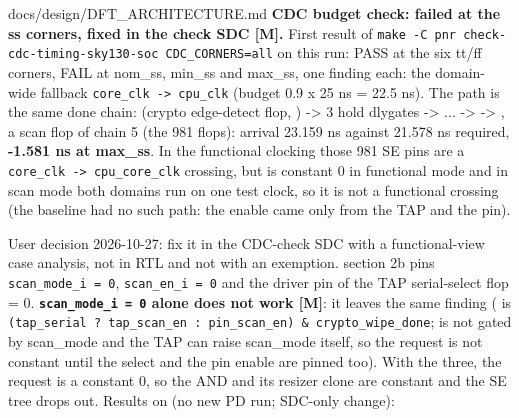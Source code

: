 \begin{relocated}{docs/design/DFT_ARCHITECTURE.md}
\textbf{CDC budget check: failed at the ss corners, fixed in the check
SDC {[}M{]}.} First result of
\texttt{make\ -\allowbreak{}C\ pnr\ check-\allowbreak{}cdc-\allowbreak{}timing-\allowbreak{}sky130-\allowbreak{}soc\ CDC\_\allowbreak{}CORNERS=\allowbreak{}all}
on this run: PASS at the six tt/ff corners, FAIL at nom\_ss, min\_ss and
max\_ss, one finding each: the domain-wide fallback
\texttt{core\_\allowbreak{}clk\ -\allowbreak{}>\ cpu\_\allowbreak{}clk}
(budget 0.9 x 25 ns = 22.5 ns). The path is the same done chain:
 (crypto edge-detect flop, )
-\textgreater{} 3 hold dlygates -\textgreater{} ... -\textgreater{}
 -\textgreater{} , a scan flop of
chain 5 (the 981  flops): arrival 23.159 ns against
21.578 ns required, \textbf{-1.581 ns at max\_ss}. In the functional
clocking those 981 SE pins are a
\texttt{core\_\allowbreak{}clk\ -\allowbreak{}>\ cpu\_\allowbreak{}core\_\allowbreak{}clk}
crossing, but  is constant 0 in functional mode and in
scan mode both domains run on one test clock, so it is not a functional
crossing (the baseline had no such path: the enable came only from the
TAP and the pin).

User decision 2026-10-27: fix it in the CDC-check SDC with a
functional-view case analysis, not in RTL and not with an 
exemption.  section 2b pins
\texttt{scan\_\allowbreak{}mode\_\allowbreak{}i\ =\allowbreak{}\ 0},
\texttt{scan\_\allowbreak{}en\_\allowbreak{}i\ =\allowbreak{}\ 0} and
the driver pin of the TAP serial-select flop
 = 0.
\textbf{\texttt{scan\_\allowbreak{}mode\_\allowbreak{}i\ =\allowbreak{}\ 0}
alone does not work {[}M{]}}: it leaves the same finding
( is
\texttt{(tap\_\allowbreak{}serial\ ?\ tap\_\allowbreak{}scan\_\allowbreak{}en\ :\allowbreak{}\ pin\_\allowbreak{}scan\_\allowbreak{}en)\ \&\ crypto\_\allowbreak{}wipe\_\allowbreak{}done};
 is not gated by scan\_mode and the TAP can raise
scan\_mode itself, so the request is not constant until the select and
the pin enable are pinned too). With the three, the request is a
constant 0, so the AND and its resizer clone are constant and the SE
tree drops out. Results on  (no new PD
run; SDC-only change):


\end{relocated}
